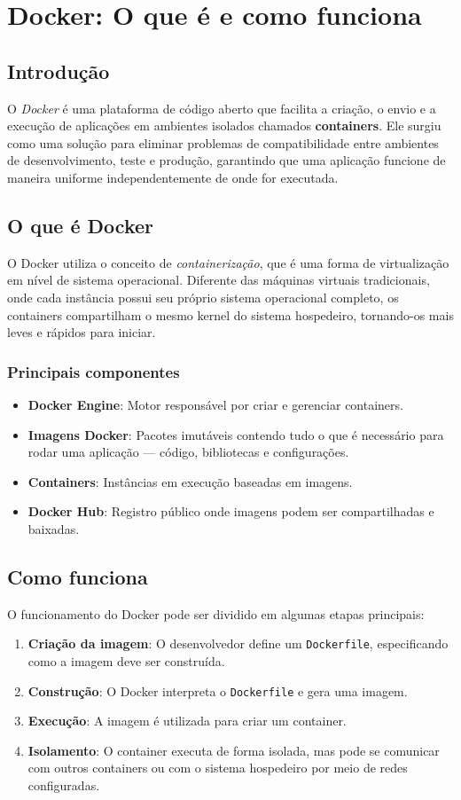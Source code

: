 \documentclass{abntex2}
\begin{document}
\chapter{Docker: O que é e como funciona}

\section{Introdução}
O \textit{Docker} é uma plataforma de código aberto que facilita a criação, o envio e a execução de aplicações em ambientes isolados chamados \textbf{containers}. 
Ele surgiu como uma solução para eliminar problemas de compatibilidade entre ambientes de desenvolvimento, teste e produção, garantindo que uma aplicação funcione de maneira uniforme independentemente de onde for executada.

\section{O que é Docker}
O Docker utiliza o conceito de \textit{containerização}, que é uma forma de virtualização em nível de sistema operacional. 
Diferente das máquinas virtuais tradicionais, onde cada instância possui seu próprio sistema operacional completo, os containers compartilham o mesmo kernel do sistema hospedeiro, tornando-os mais leves e rápidos para iniciar.

\subsection{Principais componentes}
\begin{itemize}
    \item \textbf{Docker Engine}: Motor responsável por criar e gerenciar containers.
    \item \textbf{Imagens Docker}: Pacotes imutáveis contendo tudo o que é necessário para rodar uma aplicação — código, bibliotecas e configurações.
    \item \textbf{Containers}: Instâncias em execução baseadas em imagens.
    \item \textbf{Docker Hub}: Registro público onde imagens podem ser compartilhadas e baixadas.
\end{itemize}

\section{Como funciona}
O funcionamento do Docker pode ser dividido em algumas etapas principais:
\begin{enumerate}
    \item \textbf{Criação da imagem}: O desenvolvedor define um \texttt{Dockerfile}, especificando como a imagem deve ser construída.
    \item \textbf{Construção}: O Docker interpreta o \texttt{Dockerfile} e gera uma imagem.
    \item \textbf{Execução}: A imagem é utilizada para criar um container.
    \item \textbf{Isolamento}: O container executa de forma isolada, mas pode se comunicar com outros containers ou com o sistema hospedeiro por meio de redes configuradas.
\end{enumerate}
\end{document}
